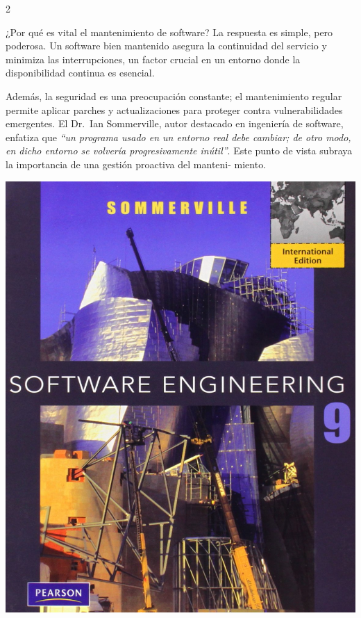 \documentclass[12pt,spanish,Letterpaper,openany]{book}
\begin{document}
\begin {multicols}{2}
\bigskip
\bigskip
\bigskip
\bigskip
\bigskip
\bigskip

¿Por qué es vital el mantenimiento de software? La respuesta es simple, pero poderosa. Un software bien mantenido asegura la continuidad del servicio y minimiza las interrupciones, un factor crucial en un entorno donde la disponibilidad continua es esencial.

Además, la seguridad es una preocupación constante; el mantenimiento regular permite aplicar parches y actualizaciones para proteger contra vulnerabilidades emergentes. El Dr.~Ian Sommerville, autor destacado en ingeniería de software, enfatiza que \emph{``un programa usado en un entorno real debe cambiar; de otro modo, en dicho entorno se volvería progresivamente inútil''}. Este punto de vista subraya la importancia de una gestión proactiva del manteni-
miento.

\begin {flushleft}
\noindent\begin{minipage}[c]{\columnwidth}

\begin{center}\includegraphics[width=0.8\linewidth]{imagenes_articulos/sp55_01} \end{center}

\end{minipage}
\end {flushleft}


\end{multicols}
\end{document}
